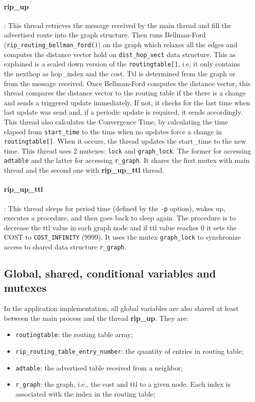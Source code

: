 \documentclass[10pt]{extarticle}
\begin{document}
\paragraph{rip\_up}:  This thread  retrieves the  message received  by the  main
thread  and fill  the  advertised  route into  the  graph  structure. Then  runs
Bellman-Ford (\texttt{rip\_routing\_bellman\_ford()}) on the graph which relaxes
all the edges and computes  the distance vector hold on \texttt{dist\_hop\_vect}
data  structure.   This  as  explained   is  a   scaled  down  version   of  the
\texttt{routingtable[]}, i.e, it only contains the nexthop as hop\_index and the
cost.   Ttl is  determined from  the graph  or from  the message  received. Once
Bellman-Ford computes  the distance  vector, this  thread compares  the distance
vector to  the routing  table if  the there is  a change  and sends  a triggered
update immediately.  If not, it  checks for the last  time when last  update was
send and,  if a periodic update  is required, it sends  accordingly. This thread
also  calculates the  Convergence Time,  by  calculating the  time elapsed  from
\texttt{start\_time}  to   the  time   when  no  updates   force  a   change  in
\texttt{routingtable[]}. When it  occurs, the thread updates  the start\_time to
the new time. This thread uses 2 mutexes: \texttt{lock} and \texttt{graph\_lock}.
The  former  for  accessing  \texttt{adtable}   and  the  latter  for  accessing
\texttt{r\_graph}. It shares the first mutex with main thread and the second one
with \textbf{rip\_up\_ttl} thread.

\paragraph{rip\_up\_ttl}: This thread sleeps for period time (defined by the
\texttt{-p} option), wakes up, executes a procedure, and then goes back to sleep
again. The procedure is to decrease the ttl value in each graph node and if ttl
value reaches 0 it sets the COST to \texttt{COST\_INFINITY} (9999). 
It uses the mutex \texttt{graph\_lock} to synchronize access to shared data
structure \texttt{r\_graph}.

\subsection{Global, shared, conditional variables and mutexes}

In the application implementation, all global variables are also shared at least
between the main process and the thread \textbf{rip\_up}. They are:

\begin{itemize}
\item{\texttt{routingtable}:} the routing table array;
\item{\texttt{rip\_routing\_table\_entry\_number}:} the quantity of entries in
  routing table;
\item{\texttt{adtable}:} the advertised table received from a neighbor;
\item{\texttt{r\_graph}:} the graph, i.e., the cost and ttl to a given
  node. Each index is associated with the index in the routing table;


\end{itemize}
\end{document}
